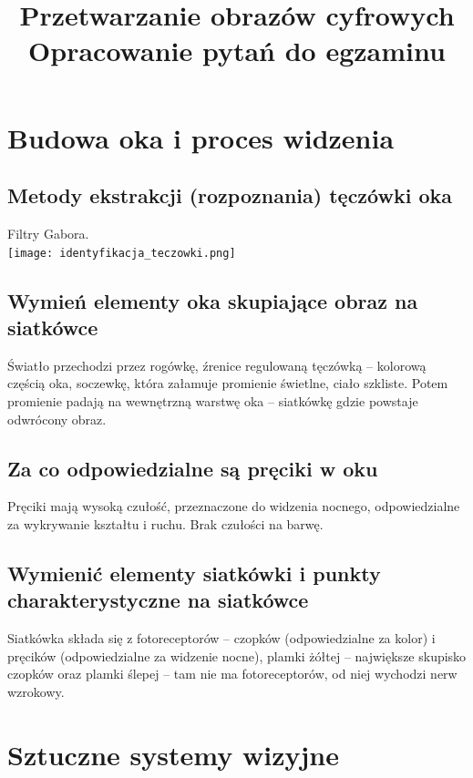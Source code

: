 \documentclass[a4paper, 12pt, titlepage]{article}
\title{Przetwarzanie obrazów cyfrowych\\
	Opracowanie pytań do egzaminu}
\begin{document}
\maketitle
\tableofcontents
\pagebreak
    
    
\pagebreak\section{Budowa oka i proces widzenia}

\subsection{Metody ekstrakcji (rozpoznania) tęczówki oka}
Filtry Gabora. \\
\texttt{[image: identyfikacja\_teczowki.png]}

\subsection{Wymień elementy oka skupiające obraz na siatkówce}
Światło przechodzi przez rogówkę, źrenice regulowaną tęczówką – kolorową częścią oka, soczewkę, która załamuje promienie świetlne, ciało szkliste. Potem promienie padają na wewnętrzną warstwę oka – siatkówkę gdzie powstaje odwrócony obraz.

\subsection{Za co odpowiedzialne są pręciki w oku}
Pręciki mają wysoką czułość, przeznaczone do widzenia nocnego, odpowiedzialne za wykrywanie kształtu i ruchu. Brak czułości na barwę.

\subsection{Wymienić elementy siatkówki i punkty charakterystyczne na siatkówce}
Siatkówka składa się z fotoreceptorów – czopków (odpowiedzialne za kolor) i pręcików (odpowiedzialne za widzenie nocne), plamki żółtej – największe skupisko czopków oraz plamki ślepej – tam nie ma fotoreceptorów, od niej wychodzi nerw wzrokowy.

\pagebreak\section{Sztuczne systemy wizyjne}
\end{document}
